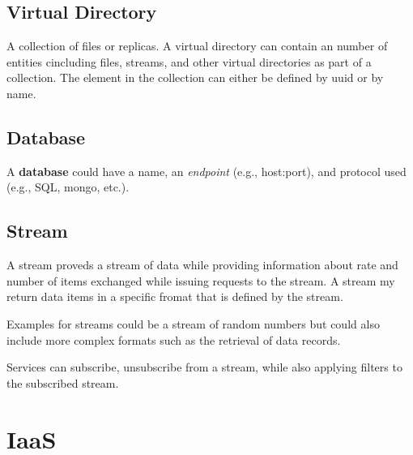 \documentclass[9pt,twocolumn,twoside]{styles/osajnl}
\begin{document}


\subsection{Virtual Directory}

A collection of files or replicas. A virtual directory can contain an
number of entities cincluding files, streams, and other virtual
directories as part of a collection. The element in the collection can
either be defined by uuid or by name. 


\subsection{Database}

A \textbf{database} could have a name, an \textit{endpoint} (e.g., host:port),
and protocol used (e.g., SQL, mongo, etc.).


\subsection{Stream} 

A stream proveds a stream of data while providing information about
rate and number of items exchanged while issuing requests to the
stream. A stream my return data items in a specific fromat that is
defined by the stream. 


Examples for streams could be a stream of random numbers but could
also include more complex formats such as the retrieval of data
records. 

Services can subscribe, unsubscribe from a stream, while also applying
filters to the subscribed stream.



\section{IaaS}
\end{document}

